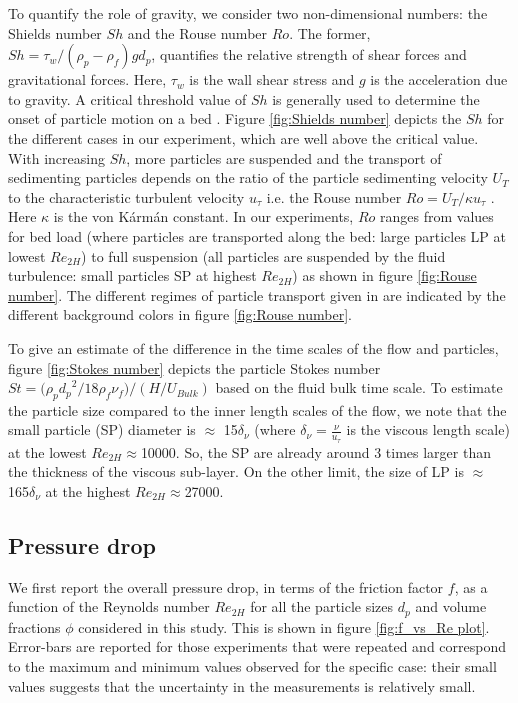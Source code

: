 \documentclass{jfm}
\begin{document}
To quantify the role of gravity, we consider two non-dimensional numbers: the Shields number $Sh$ and the Rouse number $Ro$. The former, $Sh={\tau_{w}}/{(\rho_p-\rho_f)gd_p}$, quantifies the relative strength of shear forces and gravitational forces. Here, $\tau_{w}$ is the wall shear stress and $g$ is the acceleration due to gravity. A critical threshold value of $Sh$ is generally used to determine the onset of particle motion on a bed \citep{shields1936application}. Figure \ref{fig:Shields number} depicts the $Sh$ for the different cases in our experiment, which are well above the critical value. With increasing $Sh$, more particles are suspended and the transport of sedimenting particles depends on the ratio of the particle sedimenting velocity $U_T$ to the characteristic turbulent velocity $u_\tau$ i.e. the Rouse number $Ro={U_T}/{\kappa u_\tau}$ \citep{rouse1937}. Here $\kappa$ is the von K\'arm\'an constant. In our experiments, $Ro$ ranges from values for bed load (where particles are transported along the bed: large particles LP at lowest $Re_{2H}$) to full suspension (all particles are suspended by the fluid turbulence: small particles SP at highest $Re_{2H}$) as shown in figure \ref{fig:Rouse number}. The different regimes of particle transport given in \citet{fredsoe1992mechanics} are indicated by the different background colors in figure \ref{fig:Rouse number}. 

To give an estimate of the difference in the time scales of the flow and particles, figure \ref{fig:Stokes number} depicts the particle Stokes number $St={(\rho_p{d_p}^2/{18\rho_f\nu_f}})/(H/U_{Bulk})$ based on the fluid bulk time scale. To estimate the particle size compared to the inner length scales of the flow, we note that the small particle (SP) diameter is $\approx$ 15$\delta_\nu$ (where $\delta_\nu = \frac{\nu}{u_{\tau}}$ is the viscous length scale) at the lowest $Re_{2H}\approx$10000. So, the SP are already around 3 times larger than the thickness of the viscous sub-layer. On the other limit, the size of LP is $\approx$ 165$\delta_\nu$ at the highest $Re_{2H}\approx$27000.

\subsection{Pressure drop}\label{sec:Pressure drop}
We first report the overall pressure drop, in terms of the friction factor $f$, as a function of the Reynolds number $Re_{2H}$ for all the particle sizes $d_p$ and volume fractions $\phi$ considered in this study. This is shown in figure \ref{fig:f_vs_Re plot}. Error-bars are reported for those experiments that were repeated and correspond to the maximum and minimum values observed for the specific case: their small values suggests that the uncertainty in the measurements is relatively small. 
\end{document}
